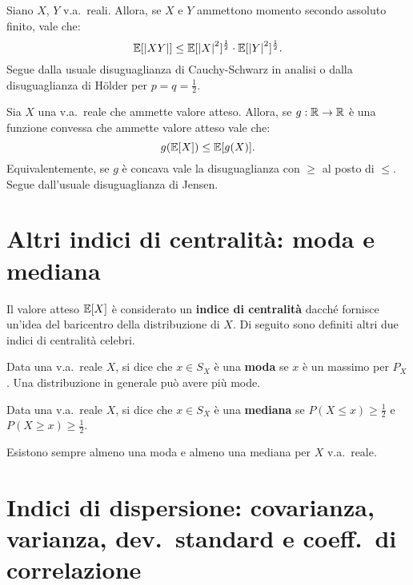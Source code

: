 \begin{multicols*}{2}
\begin{proposition}
    Siano $X$, $Y$ v.a.~reali. Allora, se $X$ e $Y$ ammettono momento secondo assoluto
    finito, vale che:
    \[
        \mathbb{E}[\left\lvert XY \right\rvert] \leq \mathbb{E}[\left\lvert X \right\rvert^2]^{\frac{1}{2}} \cdot \mathbb{E}[\left\lvert Y \right\rvert^2]^{\frac{1}{2}}.
    \]
    Segue dalla usuale disuguaglianza di Cauchy-Schwarz in analisi o dalla disuguaglianza
    di Hölder per $p = q = \frac{1}{2}$.
\end{proposition}

\begin{proposition}
    Sia $X$ una v.a.~reale che ammette valore atteso.
    Allora, se $g : \mathbb{R} \to \mathbb{R}$ è una funzione
    convessa che ammette valore atteso vale che:
    \[
        g(\mathbb{E}[X]) \leq \mathbb{E}[g(X)].
    \]
    Equivalentemente, se $g$ è concava vale la disuguaglianza con
    $\geq$ al posto di $\leq$. Segue dall'usuale disuguaglianza di Jensen.
\end{proposition}

\section{Altri indici di centralità: moda e mediana}

Il valore atteso $\mathbb{E}[X]$ è considerato un \textbf{indice di centralità} dacché
fornisce un'idea del baricentro della distribuzione di $X$. Di seguito
sono definiti altri due indici di centralità celebri.

\begin{definition}[Moda]
    Data una v.a.~reale $X$, si dice che $x \in S_X$ è una \textbf{moda}
    se $x$ è un massimo per $P_X$. Una distribuzione in generale può avere
    più mode.
\end{definition}

\begin{definition}[Mediana]
    Data una v.a.~reale $X$, si dice che $x \in S_X$ è una \textbf{mediana}
    se $P(X \leq x) \geq \frac{1}{2}$ e $P(X \geq x) \geq \frac{1}{2}$.
\end{definition}

\begin{proposition}
    Esistono sempre almeno una moda e almeno una mediana
    per $X$ v.a.~reale.
\end{proposition}

\section{Indici di dispersione: covarianza, varianza, dev.~standard e coeff.~di correlazione}


\end{multicols*}
